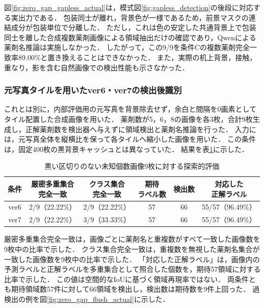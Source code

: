 \documentclass[uplatex,dvipdfmx]{jsarticle}
\begin{document}
図\ref{fig:zero_gap_gapless_actual}は，模式図\ref{fig:gapless_detection}の後段に対応する実出力である．
包装同士が離れ，背景色が一様であるため，前景マスクの連結成分が包装単位で分離した．
ただし，これは色の安定した共通背景上で包装同士を離した合成複数薬剤画像による領域抽出だけの確認であり，Qwenによる薬剤名推論は実施しなかった．
したがって，この9/9を条件Cの複数薬剤完全一致率89.00\%と置き換えることはできなかった．
また，実際の机上背景，接触，重なり，影を含む自然画像での検出性能も示さなかった．

\subsubsection{元写真タイルを用いたver6・ver7の検出後識別}\label{sec:zero_gap_identification}

これとは別に，内部評価用の元写真を背景除去せず，余白と間隔を0画素としてタイル配置した合成画像を用いた．
薬剤数が5，6，8の画像を各3枚，合計9枚生成し，正解薬剤数を検出器へ与えずに領域検出と薬剤名推論を行った．
入力には，元写真全体を縦横比を保って各タイルへ縮小した画像を用いた．
この条件は，固定400枚の黒背景キャッシュとは異なっていた．
結果を表\ref{tab:zero_gap_end_to_end}に示した．

\begin{table}[H]
  \centering
  \caption{黒い区切りのない未知個数画像9枚に対する探索的評価}
  \label{tab:zero_gap_end_to_end}
  \small
  \setlength{\tabcolsep}{4pt}
  \begin{tabular}{|c|c|c|c|c|c|}
    \hline
    条件 & \shortstack{厳密多重集合\\完全一致} & \shortstack{クラス集合\\完全一致} & \shortstack{期待\\ラベル数} & 検出数 & \shortstack{対応した\\正解ラベル} \\ \hline
    ver6 & 2/9（22.22\%） & 2/9（22.22\%） & 57 & 66 & 55/57（96.49\%） \\ \hline
    ver7 & 2/9（22.22\%） & 3/9（33.33\%） & 57 & 66 & 55/57（96.49\%） \\ \hline
  \end{tabular}
\end{table}

厳密多重集合完全一致は，画像ごとに薬剤名と重複数がすべて一致した画像数を9枚中の比率で示した．
クラス集合完全一致は，重複数を無視した薬剤名集合が一致した画像数を9枚中の比率で示した．
「対応した正解ラベル」は，画像内の予測ラベルと正解ラベルを多重集合として照合した個数を，期待57領域に対する比率で示した．
この値は空間的なIoUに基づく領域再現率ではない．
両条件とも期待領域数57件に対して66領域を検出し，検出数は期待数を9件上回った．
過検出の例を図\ref{fig:zero_gap_flush_actual}に示した．
\end{document}
